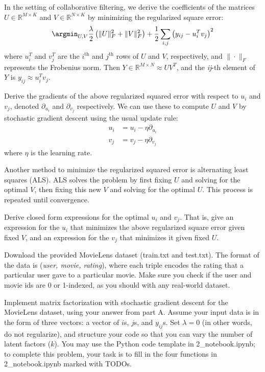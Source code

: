 In the setting of collaborative filtering, we derive the coefficients of the matrices $U \in \mathbb{R}^{M \times K}$ and $V \in \mathbb{R}^{N \times K}$ by minimizing the regularized square error:
$$\argmin_{U,V} \frac{\lambda}{2} \left( \|U\|_F^2 + \|V\|^2_F \right) + \frac{1}{2}\sum_{i,j} \left( y_{ij} - u_i^Tv_j\right)^2$$
where $u_i^T$ and $v_j^T$ are the $i^{\text{th}}$ and $j^{\text{th}}$ rows of $U$ and $V$, respectively, and $\|\cdot\|_F$ represents the Frobenius norm. Then $Y \in \mathbb{R}^{M \times N} \approx UV^T$, and the \textit{ij}-th element of $Y$ is $y_{ij} \approx u_i^Tv_j$.

\problem[5]Derive the gradients of the above regularized squared error with respect to $u_i$ and $v_j$, denoted $\partial_{u_i}$ and $\partial_{v_j}$ respectively.  We can use these to compute $U$ and $V$ by stochastic gradient descent using the usual update rule: 
\begin{align*}
u_i &= u_i - \eta \partial_{u_i} \\
v_j &= v_j - \eta \partial_{v_j}
\end{align*}
where $\eta$ is the learning rate.

\begin{solution}

\end{solution}

\problem[5]Another method to minimize the regularized squared error is alternating least squares (ALS). ALS solves the problem by first fixing $U$ and solving for the optimal $V$, then fixing this new $V$ and solving for the optimal $U$.  This process is repeated until convergence.

Derive closed form expressions for the optimal $u_i$ and $v_j$.  That is, give an expression for the $u_i$ that minimizes the above regularized square error given fixed $V$, and an expression for the $v_j$ that minimizes it given fixed $U$.

\begin{solution}
\end{solution}

\problem[10]Download the provided MovieLens dataset (train.txt and test.txt).  The format of the data is (\emph{user, movie, rating}), where each triple encodes the rating that a particular user gave to a particular movie. Make sure you check if the user and movie ids are 0 or 1-indexed, as you should with any real-world dataset.

Implement matrix factorization with stochastic gradient descent for the MovieLens dataset, using your answer from part A. Assume your input data is in the form of three vectors: a vector of $i$s, $j$s, and $y_{ij}$s. Set $\lambda = 0$ (in other words, do not regularize), and structure your code so that you can vary the number of latent factors ($k$). You may use the Python code template in 2_notebook.ipynb; to complete this problem, your task is to fill in the four functions in 2_notebook.ipynb marked with TODOs.


